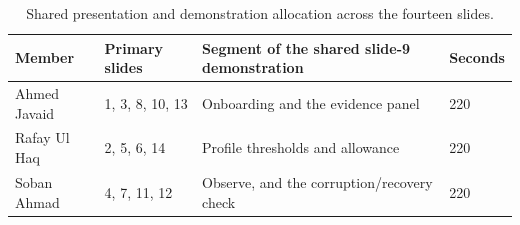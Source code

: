 \begin{longtable}{p{}p{}p{}p{}}
\caption{Shared presentation and demonstration allocation across the fourteen slides.}\label{tab:equal-speaking}\\\toprule Member & Primary slides & Segment of the shared slide-9 demonstration & Seconds\\\midrule
Ahmed Javaid & 1, 3, 8, 10, 13 & Onboarding and the evidence panel & 220\\
Rafay Ul Haq & 2, 5, 6, 14 & Profile thresholds and allowance & 220\\
Soban Ahmad & 4, 7, 11, 12 & Observe, and the corruption/recovery check & 220\\
\bottomrule\end{longtable}
